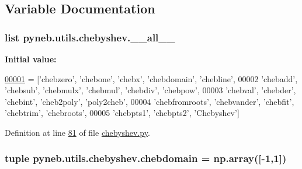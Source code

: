 \begin{DoxyCode}
\end{DoxyCode}


\subsection{Variable Documentation}
\hypertarget{namespacepyneb_1_1utils_1_1chebyshev_a9cb4e1ba55fc61d6dd46d5c6f534edbc}{
\subsubsection[{\-\_\-\-\_\-all\-\_\-\-\_\-}]{\setlength{\rightskip}{0pt plus 5cm}list pyneb.\-utils.\-chebyshev.\-\_\-\-\_\-all\-\_\-\-\_\-}}\label{namespacepyneb_1_1utils_1_1chebyshev_a9cb4e1ba55fc61d6dd46d5c6f534edbc}
{\bfseries Initial value\-:}
\begin{DoxyCode}
\hypertarget{namespacepyneb_1_1utils_1_1chebyshev_l00001}{}\hyperlink{namespacepyneb_1_1utils_1_1chebyshev}{00001} = [\textcolor{stringliteral}{'chebzero'}, \textcolor{stringliteral}{'chebone'}, \textcolor{stringliteral}{'chebx'}, \textcolor{stringliteral}{'chebdomain'}, \textcolor{stringliteral}{'chebline'},
00002         \textcolor{stringliteral}{'chebadd'}, \textcolor{stringliteral}{'chebsub'}, \textcolor{stringliteral}{'chebmulx'}, \textcolor{stringliteral}{'chebmul'}, \textcolor{stringliteral}{'chebdiv'}, \textcolor{stringliteral}{'chebpow'},
00003         \textcolor{stringliteral}{'chebval'}, \textcolor{stringliteral}{'chebder'}, \textcolor{stringliteral}{'chebint'}, \textcolor{stringliteral}{'cheb2poly'}, \textcolor{stringliteral}{'poly2cheb'},
00004         \textcolor{stringliteral}{'chebfromroots'}, \textcolor{stringliteral}{'chebvander'}, \textcolor{stringliteral}{'chebfit'}, \textcolor{stringliteral}{'chebtrim'}, \textcolor{stringliteral}{'chebroots'},
00005         \textcolor{stringliteral}{'chebpts1'}, \textcolor{stringliteral}{'chebpts2'}, \textcolor{stringliteral}{'Chebyshev'}]
\end{DoxyCode}


Definition at line \hyperlink{chebyshev_8py_source_l00081}{81} of file \hyperlink{chebyshev_8py_source}{chebyshev.\-py}.

\hypertarget{namespacepyneb_1_1utils_1_1chebyshev_a57e110567544748d0de429d3743d1241}{
\subsubsection[{chebdomain}]{\setlength{\rightskip}{0pt plus 5cm}tuple pyneb.\-utils.\-chebyshev.\-chebdomain = np.\-array(\mbox{[}-\/1,1\mbox{]})}}\label{namespacepyneb_1_1utils_1_1chebyshev_a57e110567544748d0de429d3743d1241}


